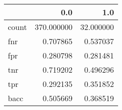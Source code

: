 \begin{tabular}{lrr}
\toprule
{} &         0.0 &        1.0 \\
\midrule
count &  370.000000 &  32.000000 \\
fnr   &    0.707865 &   0.537037 \\
fpr   &    0.280798 &   0.281481 \\
tnr   &    0.719202 &   0.496296 \\
tpr   &    0.292135 &   0.351852 \\
bacc  &    0.505669 &   0.368519 \\
\bottomrule
\end{tabular}
